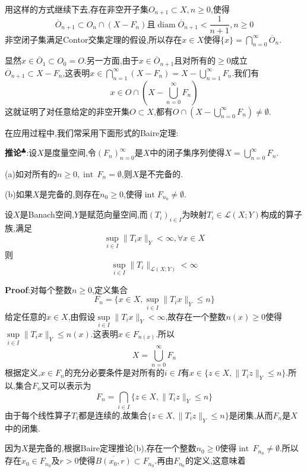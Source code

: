 用这样的方式继续下去,存在非空开子集$O_{n+1}\subset X,n\geqslant 0$,使得
$$
\overline{O}_{n+1}\subset O_n\cap(X-F_n)\text{且}\operatorname{diam}\overline{O}_{n+1}<\frac{1}{n+1},n\geqslant 0
$$
\qquad 非空闭子集满足Contor交集定理的假设,所以存在$x\in X$使得$\{x\}=\bigcap_{n=0}^{\infty}\overline{O}_n$.\par
显然$x\in \overline{O}_1\subset O_0=O$.另一方面,由于$x\in \overline{O}_{n+1}$且对所有的$\geqslant 0$成立$\overline{O}_{n+1}\subset X-F_n$,这表明$x\in \bigcap_{n=1}^{\infty}(X-F_n)=X-\bigcup_{n=1}^{\infty}F_n$.我们有
$$
x\in O\cap\left(X-\bigcup^{\infty}_{n=0}F_n\right)
$$
这就证明了对任意给定的非空开集$O\subset X$,都有$O\cap\left(X-\bigcup^{\infty}_{n=0}F_n\right)\neq \emptyset$.\par
在应用过程中,我们常采用下面形式的Baire定理:\par
\textbf{推论}$^\clubsuit $:设$X$是度量空间,令$(F_n)^{\infty}_{n=0}$是$X$中的闭子集序列使得$X=\bigcup^{\infty}_{n=0}F_n$.\par
\quad (a)如对所有的$n\geqslant 0,\operatorname{int}\,F_n=\emptyset$,则$X$是不完备的.\par
\quad (b)如果$X$是完备的,则存在$n_0\geqslant 0$,使得$\operatorname{int} F_{n_0}\neq \emptyset$.\par
\begin{tcolorbox}[colback=KuangNei,colframe=BianKuang,title=\textbf{Banach-Steinhaus定理(一致有界性定理)},sharpish corners]
    设$X$是Banach空间,$Y$是赋范向量空间,而$(T_i)_{i\in I}$为映射$T_i\in\mathcal{L}(X;Y)$构成的算子族,满足
    $$
    \sup\limits_{i\in I}\|T_ix\|_{Y}<\infty,\forall x\in X
    $$
    则
    $$
    \sup\limits_{i\in I}\|T_i\|_{\mathcal{L}(X;Y)}<\infty
    $$
\end{tcolorbox}
\textbf{Proof}:对每个整数$n\geqslant 0$,定义集合
$$
F_n=\{x\in X,\sup\limits_{i\in I}\|T_ix\|_{Y}\leqslant n\}
$$
给定任意的$x\in X$,由假设$\sup\limits_{i\in I}\|T_ix\|_{Y}<\infty$,故存在一个整数$n(x)\geqslant 0$使得$\sup\limits_{i\in I}\|T_ix\|_{Y}\leqslant n(x)$.这表明$x\in F_{n(x)}$.所以
$$
X=\bigcup_{n=0}^{\infty}F_n
$$
根据定义,$x\in F_n$的充分必要条件是对所有的$i\in I$有$x\in \{z\in X,\|T_iz\|_{Y}\leqslant n\}$.所以,集合$F_n$又可以表示为
$$
F_n=\bigcap_{i\in I}\{z\in X,\|T_iz\|_{Y}\leqslant n\}
$$
由于每个线性算子$T_i$都是连续的,故集合$\{z\in X,\|T_iz\|_{Y}\leqslant n\}$是闭集,从而$F_n$是$X$中的闭集.\par
因为$X$是完备的,根据Baire定理推论(b),存在一个整数$n_0\geqslant 0$使得$\operatorname{int}\,F_{n_0}\neq\emptyset$.所以存在$x_0\in F_{n_0}$及$r>0$使得$\overline{B(x_0,r)}\subset F_{n_0}$.再由$F_{n_0}$的定义,这意味着
